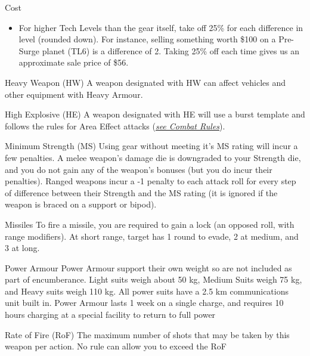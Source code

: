 \begin{multicols}{2}
\begin{genericsection}{Cost}
\begin{itemize}
  \item For higher Tech Levels than the gear itself, take off 25\% for each difference in level (rounded down). For instance, selling something worth \$100 on a Pre-Surge planet (TL6) is a difference of 2. Taking 25\% off each time gives us an approximate sale price of \$56.
\end{itemize}
\end{genericsection}

\begin{genericsection}{Heavy Weapon (HW)}
A weapon designated with HW can affect vehicles and other equipment with Heavy Armour.
\end{genericsection}

\begin{genericsection}{High Explosive (HE)}
A weapon designated with HE will use a burst template and follows the rules for Area Effect attacks (\textit{\hyperref[sec:rules-combat]{see Combat Rules}}).
\end{genericsection}

\begin{genericsection}{Minimum Strength (MS)}
Using gear without meeting it's MS rating will incur a few penalties. A melee weapon's damage die is downgraded to your Strength die, and you do not gain any of the weapon's bonuses (but you do incur their penalties). Ranged weapons incur a -1 penalty to each attack roll for every step of difference between their Strength and the MS rating (it is ignored if the weapon is braced on a support or bipod).
\end{genericsection}

\begin{genericsection}{Missiles}
To fire a missile, you are required to gain a lock (an opposed roll, with range modifiers). At short range, target has 1 round to evade, 2 at medium, and 3 at long.
\end{genericsection}

\begin{genericsection}{Power Armour}
Power Armour support their own weight so are not included as part of encumberance. Light suits weigh about 50 kg, Medium Suits weigh 75 kg, and Heavy suits weigh 110 kg. All power suits have a 2.5 km communications unit built in. Power Armour lasts 1 week on a single charge, and requires 10 hours charging at a special facility to return to full power
\end{genericsection}

\begin{genericsection}{Rate of Fire (RoF)}
The maximum number of shots that may be taken by this weapon per action. No rule can allow you to exceed the RoF
\end{genericsection}


\end{multicols}
